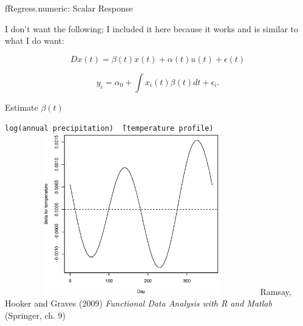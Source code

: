 \documentclass[compress]{beamer}
\begin{document}
\begin{frame}{fRegress.numeric:  Scalar Response}



I don't want the following;  I included it here
because it works and is similar to what I do want:
\newline

\[ D x(t) = \beta(t) x(t) + \alpha(t) u(t) + \epsilon(t) \]
\newline \newline \newline

\[ y_i = \alpha_0 + \int x_i(t) \beta(t) d t + \epsilon_i. \]

%



Estimate $\beta(t)$

%
\texttt{log(annual precipitation) \~\ (temperature profile)}
\includegraphics[height=7cm, width=11cm]{figs/precbeta5}
\newline \newline \newline
Ramsay, Hooker and Graves (2009)
\emph{Functional Data Analysis with R and Matlab}
(Springer, ch. 9)

\end{frame}
\end{document}
